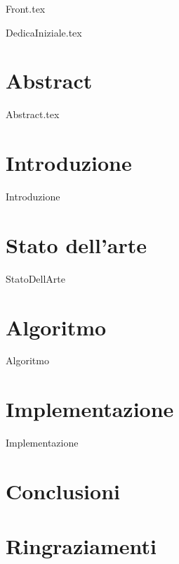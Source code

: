 \documentclass[12pt,onesidet]{report}
\begin{document}
	
	\begin{titlepage}
		{Front.tex}
	\end{titlepage}

	{DedicaIniziale.tex}
    
    
    \chapter*{Abstract}
    {Abstract.tex}
    
    \tableofcontents{}
    \listoftables
    \listoflistings
    \newpage
    
    
    \chapter{Introduzione}
    {Introduzione}
    
    \chapter{Stato dell'arte}
    {StatoDellArte}
    
    \chapter{Algoritmo}
    {Algoritmo}
    
    \chapter{Implementazione}
    {Implementazione}
    
    \chapter{Conclusioni}
    
    \chapter{Ringraziamenti}
    
     
    
    
\end{document}
